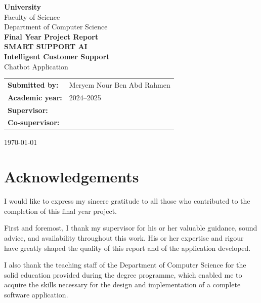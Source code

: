 \documentclass[12pt,a4paper]{report}
\begin{document}
\begin{titlepage}
  \centering
  \vspace*{1.5cm}
  {\Large\textbf{University}}\\[0.5cm]
  {\large Faculty of Science}\\[0.3cm]
  {\large Department of Computer Science}\\[2cm]
  \vfill
  {\LARGE\textbf{Final Year Project Report}}\\[1cm]
  {\Huge\textbf{SMART SUPPORT AI}}\\[0.5cm]
  {\Large\textbf{Intelligent Customer Support}}\\[0.3cm]
  {\large Chatbot Application}\\[2cm]
  \vfill
  \begin{tabular}{ll}
    \textbf{Submitted by:} & Meryem Nour Ben Abd Rahmen \\[0.5cm]
    \textbf{Academic year:} & 2024--2025 \\[0.5cm]
    \textbf{Supervisor:} & \\[0.2cm]
    \textbf{Co-supervisor:} & \\[0.5cm]
  \end{tabular}
  \vfill
  {\large \today}
\end{titlepage}

\chapter*{Acknowledgements}

I would like to express my sincere gratitude to all those who contributed to the completion of this final year project.

First and foremost, I thank my supervisor for his or her valuable guidance, sound advice, and availability throughout this work. His or her expertise and rigour have greatly shaped the quality of this report and of the application developed.

I also thank the teaching staff of the Department of Computer Science for the solid education provided during the degree programme, which enabled me to acquire the skills necessary for the design and implementation of a complete software application.
\end{document}
